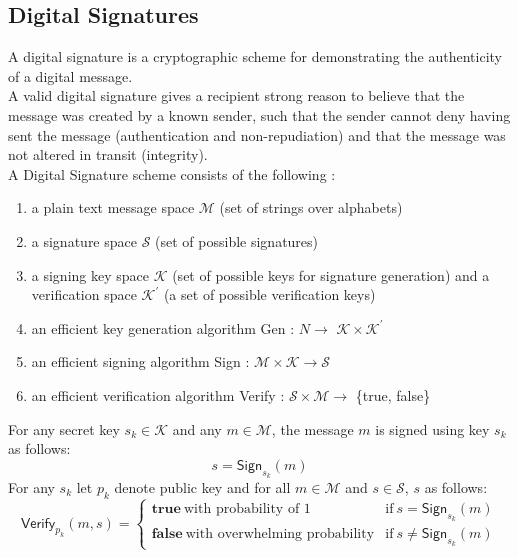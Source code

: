 \documentclass[%
  slidesonly,%
  semlayer%
  ]{xseminar}                                  %
\begin{document}
\begin{slide}
  \subsection*{Digital Signatures}
    A digital signature is a cryptographic scheme for demonstrating the authenticity of a digital message.\\
    A valid digital signature gives a recipient strong reason to believe that the message was created by a known sender, such that the sender cannot deny having sent the message (authentication and non-repudiation) and that the message was not altered in transit (integrity).\\
    A Digital Signature scheme consists of the following :
    \begin{enumerate}
      \item a plain text message space $\mathcal{M}$ (set of strings over alphabets)
      \item a signature space $\mathcal{S}$ (set of possible signatures)
      \item a signing key space $\mathcal{K}$ (set of possible keys for signature generation) and a verification space $\mathcal{K^{'}}$ (a set of possible verification keys)
      \item an efficient key generation algorithm \textsf{Gen} : $N \rightarrow$ $\mathcal{K} \times \mathcal{K^{'}} $ 
      \item an efficient signing algorithm \textsf{Sign} : $ \mathcal{M} \times \mathcal{K} \rightarrow \mathcal{S}$
      \item an efficient verification algorithm \textsf{Verify} : $\mathcal{S} \times \mathcal{M} \rightarrow$ \{true, false\} 
    \end{enumerate}
    For any secret key $s_{k} \in \mathcal{K}$ and any $m \in \mathcal{M}$, the message $m$ is signed using key $s_{k}$ as follows:
      \begin{equation}
        s = \textsf{Sign}_{s_{k}}(m)
        \label{eq:signature}
      \end{equation}
    For any $s_{k}$ let $p_{k}$ denote public key and for all $m \in \mathcal{M}$ and $s \in \mathcal{S}$, $s$ as follows:
    \begin{equation}
      \textsf{Verify}_{p_{k}}(m,s) = 
      \begin{cases}
       \textbf{true}\ \mbox{with probability of 1} & \mbox{if}\ s = \textsf{Sign}_{s_{k}}(m)\\
       \textbf{false}\ \mbox{with overwhelming probability} & \mbox{if}\ s \neq \textsf{Sign}_{s_{k}}(m)

\end{cases}
\end{equation}
\end{slide}
\end{document}
